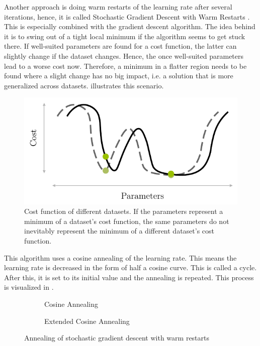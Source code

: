 Another approach is doing warm restarts of the learning rate after several iterations, hence, it is called Stochastic Gradient Descent with Warm Restarts \cite{DBLP:journals/corr/LoshchilovH16a}.
This is especially combined with the gradient descent algorithm.
The idea behind it is to swing out of a tight local minimum if the algorithm seems to get stuck there.
If well-suited parameters are found for a cost function, the latter can slightly change if the dataset changes.
Hence, the once well-suited parameters lead to a worse cost now.
Therefore, a minimum in a flatter region needs to be found where a slight change has no big impact, i.e. a solution that is more generalized across datasets.
 illustrates this scenario.
\begin{figure}
	\centering
	\includegraphics[]{images/sgdr-cost.pdf}
	\caption[Cost function of different datasets]{Cost function of different datasets. If the parameters represent a minimum of a dataset's cost function, the same parameters do not inevitably represent the minimum of a different dataset's cost function.}
	\label{fig:sgdr-cost}
\end{figure}
This algorithm uses a cosine annealing of the learning rate.
This means the learning rate is decreased in the form of half a cosine curve.
This is called a cycle.
After this, it is set to its initial value and the annealing is repeated.
This process is visualized in .
\begin{figure}
	\setlength{}
	\setlength{}
	\centering
	\begin{subfigure}{.49\textwidth}
		\centering
		
		\caption{Cosine Annealing}
		\label{fig:sgdr-annealing-normal}
	\end{subfigure}%
	\setlength{}
	\begin{subfigure}{.49\textwidth}
		\centering
		
		\caption{Extended Cosine Annealing}
		\label{fig:sgdr-annealing-extended}
	\end{subfigure}
	\caption{Annealing of stochastic gradient descent with warm restarts}
	\label{fig:sgdr-annealing}
\end{figure}
